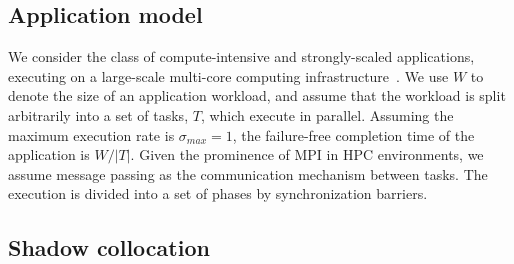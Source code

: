

\subsection {Application model}
\label{sec:app_model}

We consider the class of compute-intensive and strongly-scaled applications, executing on a large-scale multi-core computing infrastructure~\cite{doe_ascr_exascale_2011}. %
We use $W$ to denote the size of an application workload, and assume that the workload is split arbitrarily into a set of tasks, $T$, which execute in parallel. %
Assuming the maximum execution rate is $\sigma_{max}=1$, the failure-free completion time of the application is $W/|T|$. 
Given the prominence of MPI in HPC environments, we assume message passing as the communication mechanism between tasks. %
The execution is divided into a set of phases by synchronization barriers. 




\subsection{Shadow collocation}

